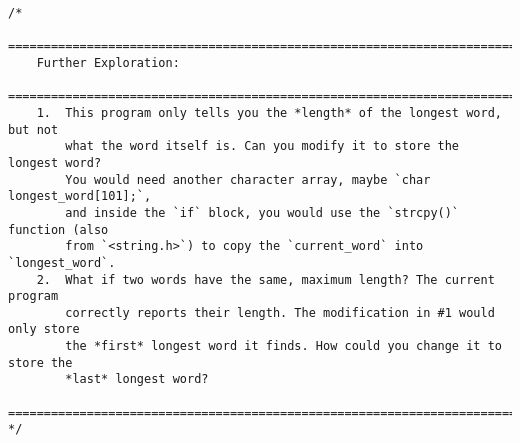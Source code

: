 \documentclass[11pt]{book}
\begin{document}
\begin{verbatim}
/*
    ================================================================================
    Further Exploration:
    ================================================================================
    1.  This program only tells you the *length* of the longest word, but not
        what the word itself is. Can you modify it to store the longest word?
        You would need another character array, maybe `char longest_word[101];`,
        and inside the `if` block, you would use the `strcpy()` function (also
        from `<string.h>`) to copy the `current_word` into `longest_word`.
    2.  What if two words have the same, maximum length? The current program
        correctly reports their length. The modification in #1 would only store
        the *first* longest word it finds. How could you change it to store the
        *last* longest word?
    ================================================================================
*/

\end{verbatim}
\clearpage
\end{document}
